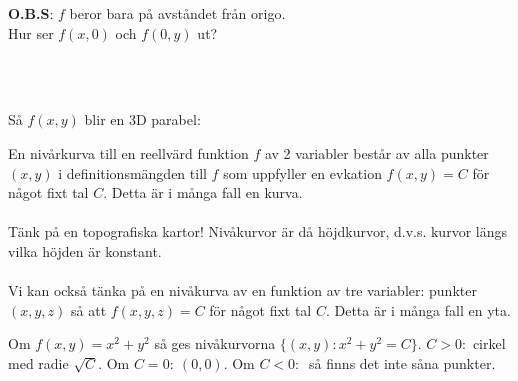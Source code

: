 \documentclass{report}
\begin{document}
{
\textbf{O.B.S}: $ f $ beror bara på avståndet från origo.\\
Hur ser $ f(x,0) $ och $ f(0,y) $ ut?\\
\\
\\
Så $ f(x,y) $ blir en 3D parabel:
}

{
En nivårkurva till en reellvärd funktion $ f $ av 2 variabler består av alla punkter $ (x,y) $ i definitionsmängden till $ f $ som uppfyller en evkation $ f(x,y) = C $ för något fixt tal $ C $. Detta är i många fall en kurva.\\\\

Tänk på en topografiska kartor! Nivåkurvor är då höjdkurvor, d.v.s. kurvor längs vilka höjden är konstant.\\\\

Vi kan också tänka på en nivåkurva av en funktion av tre variabler: punkter $ (x,y,z) $ så att $ f(x,y,z) = C $ för något fixt tal $ C $. Detta är i många fall en yta.  
}

\ex{}
{
	Om $ f(x,y) = x^2+y^2 $ så ges nivåkurvorna $ \{ (x,y) : x^2+y^2 = C \} $. $ C > 0: $ cirkel med radie $ \sqrt{C}  $. Om $ C = 0: \: (0,0) $. Om $ C < 0: \: $ så finns det inte såna punkter.    
}
\end{document}
